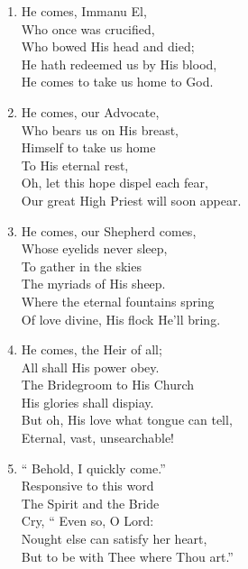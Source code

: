\documentclass[11pt,a4paper]{article}
\begin{document}
\begin{enumerate}
    \item He comes, Immanu El, \\
        Who once was crucified, \\
        Who bowed His head and died; \\
        He hath redeemed us by His blood, \\
        He comes to take us home to God.

    \item He comes, our Advocate, \\
        Who bears us on His breast, \\
        Himself to take us home \\
        To His eternal rest, \\
        Oh, let this hope dispel each fear, \\
        Our great High Priest will soon appear.

    \item He comes, our Shepherd comes, \\
        Whose eyelids never sleep, \\
        To gather in the skies \\
        The myriads of His sheep. \\
        Where the eternal fountains spring \\
        Of love divine, His flock He'll bring.

    \item He comes, the Heir of all; \\
        All shall His power obey. \\
        The Bridegroom to His Church \\
        His glories shall dispiay. \\
        But oh, His love what tongue can tell, \\
        Eternal, vast, unsearchable!

    \item `` Behold, I quickly come.'' \\
        Responsive to this word \\
        The Spirit and the Bride \\
        Cry, `` Even so, O Lord: \\
        Nought else can satisfy her heart, \\
        But to be with Thee where Thou art.''

\end{enumerate}
\end{document}
